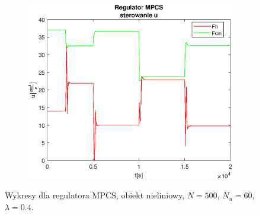 \begin{figure}[h!]
   \begin{subfigure}[b]{0.4\textwidth}
      \includegraphics[width=1\linewidth]{img/MPCSanaRK/MPCSRKControlN500Nu60l40.eps}
      \caption{}
      \label{fig:fig:MPCSRKN500Nu60l403}
   \end{subfigure}
       
   \caption{Wykresy dla regulatora MPCS, obiekt nieliniowy, $N = 500$, $N_u = 60$, $\lambda = 0.4$.}
   \label{fig:MPCSRKN500Nu60l40}
\end{figure}
           
